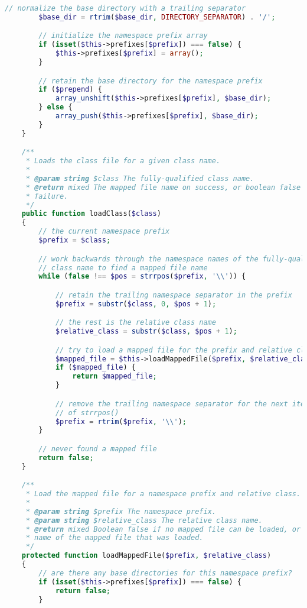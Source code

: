 \begin{lstlisting}[language=PHP]
        // normalize the base directory with a trailing separator
        $base_dir = rtrim($base_dir, DIRECTORY_SEPARATOR) . '/';

        // initialize the namespace prefix array
        if (isset($this->prefixes[$prefix]) === false) {
            $this->prefixes[$prefix] = array();
        }

        // retain the base directory for the namespace prefix
        if ($prepend) {
            array_unshift($this->prefixes[$prefix], $base_dir);
        } else {
            array_push($this->prefixes[$prefix], $base_dir);
        }
    }

    /**
     * Loads the class file for a given class name.
     *
     * @param string $class The fully-qualified class name.
     * @return mixed The mapped file name on success, or boolean false on
     * failure.
     */
    public function loadClass($class)
    {
        // the current namespace prefix
        $prefix = $class;

        // work backwards through the namespace names of the fully-qualified
        // class name to find a mapped file name
        while (false !== $pos = strrpos($prefix, '\\')) {

            // retain the trailing namespace separator in the prefix
            $prefix = substr($class, 0, $pos + 1);

            // the rest is the relative class name
            $relative_class = substr($class, $pos + 1);

            // try to load a mapped file for the prefix and relative class
            $mapped_file = $this->loadMappedFile($prefix, $relative_class);
            if ($mapped_file) {
                return $mapped_file;
            }

            // remove the trailing namespace separator for the next iteration
            // of strrpos()
            $prefix = rtrim($prefix, '\\');
        }

        // never found a mapped file
        return false;
    }

    /**
     * Load the mapped file for a namespace prefix and relative class.
     *
     * @param string $prefix The namespace prefix.
     * @param string $relative_class The relative class name.
     * @return mixed Boolean false if no mapped file can be loaded, or the
     * name of the mapped file that was loaded.
     */
    protected function loadMappedFile($prefix, $relative_class)
    {
        // are there any base directories for this namespace prefix?
        if (isset($this->prefixes[$prefix]) === false) {
            return false;
        }


\end{lstlisting}
